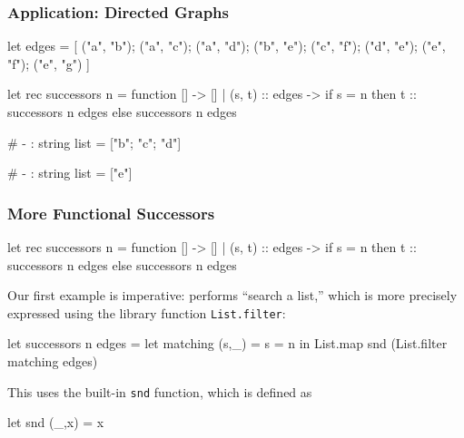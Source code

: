 \documentclass{plt}
\begin{document}
\begin{frame}[fragile]
  \frametitle{Application: Directed Graphs}

\begin{minipage}{0.6\textwidth}
\begin{ocaml}
let edges = [
  ("a", "b"); ("a", "c");
  ("a", "d"); ("b", "e");
  ("c", "f"); ("d", "e");
  ("e", "f"); ("e", "g") ]

let rec successors n = function
    []              -> []
  | (s, t) :: edges ->
      if s = n then
         t :: successors n edges
      else
         successors n edges
\end{ocaml}
\end{minipage}%
\begin{minipage}{0.4\textwidth}
  \graph
\end{minipage}

\begin{interactive}
# 
- : string list = ["b"; "c"; "d"]

# 
- : string list = ["e"]
\end{interactive}

\end{frame}

\begin{frame}[fragile]
  \frametitle{More Functional Successors}

\begin{ocaml}
let rec successors n = function
    []              -> []
  | (s, t) :: edges ->
      if s = n then
         t :: successors n edges
      else
         successors n edges
\end{ocaml}

Our first example is imperative: performs ``search a list,'' which is more
precisely expressed using the library function \texttt{List.filter}:

\begin{ocaml}
let successors n edges = 
    let matching (s,_) = s = n in
    List.map snd (List.filter matching edges)
\end{ocaml}

This uses the built-in \texttt{snd} function, which is defined as

\begin{ocaml}
let snd (_,x) = x
\end{ocaml}

\end{frame}
\end{document}
